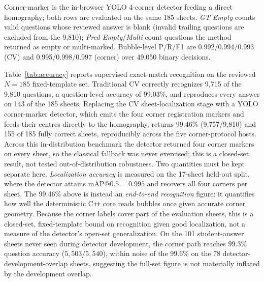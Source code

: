 \documentclass[conference]{IEEEtran}
\begin{document}
\begin{table}[!htb]
\caption{Supervised question-level recognition accuracy on the reviewed
$N{=}185$ set.}
\label{tab:accuracy}
\centering
\setlength{\tabcolsep}{3pt}

\vspace{2pt}
\parbox{\columnwidth}{\footnotesize
Corner-marker is the in-browser YOLO 4-corner detector feeding a direct
homography; both rows are evaluated on the same 185 sheets. \emph{GT Empty}
counts valid questions whose reviewed answer is blank (invalid trailing
questions are excluded from the 9{,}810); \emph{Pred Empty}/\emph{Multi}
count questions the method returned as empty or multi-marked. Bubble-level
P/R/F1 are 0.992/0.994/0.993 (CV) and 0.995/0.998/0.997 (corner) over
49{,}050 binary decisions.}
\end{table}

Table~\ref{tab:accuracy} reports supervised exact-match recognition on
the reviewed $N{=}185$ fixed-template set. Traditional CV correctly
recognizes 9{,}715 of the 9{,}810 questions, a question-level accuracy of
99.03\%, and reproduces every answer on 143 of the 185 sheets. Replacing
the CV sheet-localization stage with a YOLO corner-marker detector, which
emits the four corner registration markers and feeds their centres directly
to the homography, returns 99.46\% (9{,}757/9{,}810) and 155 of 185 fully
correct sheets, reproducibly across the five corner-protocol hosts. Across this in-distribution benchmark the detector returned four corner markers on
every sheet, so the classical fallback was never exercised; this is a closed-set
result, not tested out-of-distribution robustness. Two quantities must be kept separate here. \emph{Localization accuracy} is measured on the 17-sheet held-out split, where the detector attains $\mathrm{mAP}@0.5{=}0.995$ and recovers all four corners per sheet. The 99.46\% above is instead an \emph{end-to-end recognition} figure: it quantifies how well the deterministic C\texttt{++} core reads bubbles once given accurate corner geometry. Because the corner labels cover part of the evaluation sheets, this is a closed-set, fixed-template bound on recognition given good localization, not a measure of the detector's open-set generalization. On the 101
student-answer sheets never seen during detector development, the corner path
reaches $99.3\%$ question accuracy ($5{,}503/5{,}540$), within noise of the
$99.6\%$ on the 78 detector-development-overlap sheets, suggesting the full-set figure is
not materially inflated by the development overlap.
\end{document}
